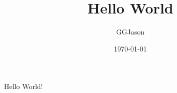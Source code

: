 \documentclass{article} %
\author{GGJason}%
\title{Hello World}%
\date{\today}%
\begin{document}
\maketitle%
Hello World! 
\end{document}
